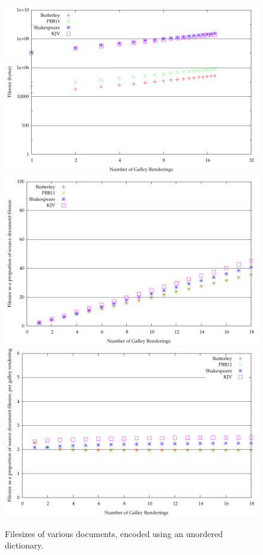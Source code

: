 \begin{figure}
  \begin{center}
  \includegraphics[width=\textwidth]{gnuplot/3-b}
  \includegraphics[width=\textwidth]{gnuplot/3-s}
  \includegraphics[width=\textwidth]{gnuplot/3-r}
  \end{center}
  \caption[Filesizes with an unordered dictionary]{Filesizes of various documents, encoded using an unordered dictionary.}
  \label{fig:size-unord}
\end{figure}



